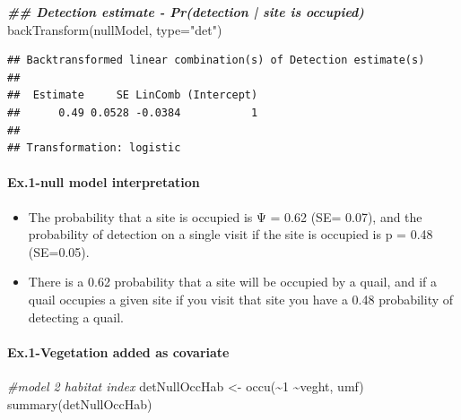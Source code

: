 \documentclass[
]{article}
\newenvironment{Shaded}{\begin{snugshade}}{\end{snugshade}}
\newcommand{\AttributeTok}[1]{\textcolor[rgb]{0.77,0.63,0.00}{#1}}
\newcommand{\CommentTok}[1]{\textcolor[rgb]{0.56,0.35,0.01}{\textit{#1}}}
\newcommand{\DecValTok}[1]{\textcolor[rgb]{0.00,0.00,0.81}{#1}}
\newcommand{\DocumentationTok}[1]{\textcolor[rgb]{0.56,0.35,0.01}{\textbf{\textit{#1}}}}
\newcommand{\FunctionTok}[1]{\textcolor[rgb]{0.00,0.00,0.00}{#1}}
\newcommand{\NormalTok}[1]{#1}
\newcommand{\OtherTok}[1]{\textcolor[rgb]{0.56,0.35,0.01}{#1}}
\newcommand{\SpecialCharTok}[1]{\textcolor[rgb]{0.00,0.00,0.00}{#1}}
\newcommand{\StringTok}[1]{\textcolor[rgb]{0.31,0.60,0.02}{#1}}
\begin{document}
\begin{Shaded}
\begin{Highlighting}[]
\DocumentationTok{\#\# Detection estimate {-} Pr(detection | site is occupied)}
\FunctionTok{backTransform}\NormalTok{(nullModel, }\AttributeTok{type=}\StringTok{"det"}\NormalTok{)}
\end{Highlighting}
\end{Shaded}

\begin{verbatim}
## Backtransformed linear combination(s) of Detection estimate(s)
## 
##  Estimate     SE LinComb (Intercept)
##      0.49 0.0528 -0.0384           1
## 
## Transformation: logistic
\end{verbatim}

\hypertarget{ex.1-null-model-interpretation}{%
\paragraph{\texorpdfstring{\textbf{Ex.1-null model
interpretation}}{Ex.1-null model interpretation}}\label{ex.1-null-model-interpretation}}

\begin{itemize}
\item
  The probability that a site is occupied is Ψ = 0.62 (SE= 0.07), and
  the probability of detection on a single visit if the site is occupied
  is p = 0.48 (SE=0.05).
\item
  There is a 0.62 probability that a site will be occupied by a quail,
  and if a quail occupies a given site if you visit that site you have a
  0.48 probability of detecting a quail.
\end{itemize}

\hypertarget{ex.1-vegetation-added-as-covariate}{%
\paragraph{\texorpdfstring{\textbf{Ex.1-Vegetation added as
covariate}}{Ex.1-Vegetation added as covariate}}\label{ex.1-vegetation-added-as-covariate}}

\begin{Shaded}
\begin{Highlighting}[]
\CommentTok{\#model 2 habitat index}
\NormalTok{detNullOccHab }\OtherTok{\textless{}{-}} \FunctionTok{occu}\NormalTok{(}\SpecialCharTok{\textasciitilde{}}\DecValTok{1} \SpecialCharTok{\textasciitilde{}}\NormalTok{veght, umf)}
\FunctionTok{summary}\NormalTok{(detNullOccHab)}
\end{Highlighting}
\end{Shaded}
\end{document}
